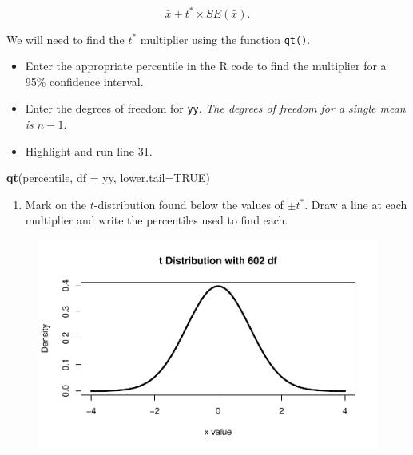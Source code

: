 \documentclass[
]{report}
\newenvironment{Shaded}{\begin{snugshade}}{\end{snugshade}}
\newcommand{\AttributeTok}[1]{\textcolor[rgb]{0.13,0.29,0.53}{#1}}
\newcommand{\ConstantTok}[1]{\textcolor[rgb]{0.56,0.35,0.01}{#1}}
\newcommand{\FunctionTok}[1]{\textcolor[rgb]{0.13,0.29,0.53}{\textbf{#1}}}
\newcommand{\NormalTok}[1]{#1}
\providecommand{\tightlist}{%
  \setlength{\itemsep}{0pt}\setlength{\parskip}{0pt}}
\begin{document}
\[\bar{x}\pm t^* \times SE(\bar{x}).\]

We will need to find the \(t^*\) multiplier using the function \texttt{qt()}.

\begin{itemize}
\item
  Enter the appropriate percentile in the R code to find the multiplier for a 95\% confidence interval.
\item
  Enter the degrees of freedom for \texttt{yy}. \emph{The degrees of freedom for a single mean is \(n-1\)}.
\item
  Highlight and run line 31.
\end{itemize}

\begin{Shaded}
\begin{Highlighting}[]
\FunctionTok{qt}\NormalTok{(percentile, }\AttributeTok{df =}\NormalTok{ yy, }\AttributeTok{lower.tail=}\ConstantTok{TRUE}\NormalTok{)}
\end{Highlighting}
\end{Shaded}

\begin{enumerate}
\def\labelenumi{\arabic{enumi}.}
\setcounter{enumi}{3}
\tightlist
\item
  Mark on the \(t\)-distribution found below the values of \(\pm t^*\). Draw a line at each multiplier and write the percentiles used to find each.
  \vspace{1mm}
\end{enumerate}

\begin{figure}

{\centering \includegraphics[width=0.75\linewidth]{07-A14-onemean-CI_files/figure-latex/tst-1} 

}

\end{figure}

\newpage
\end{document}
